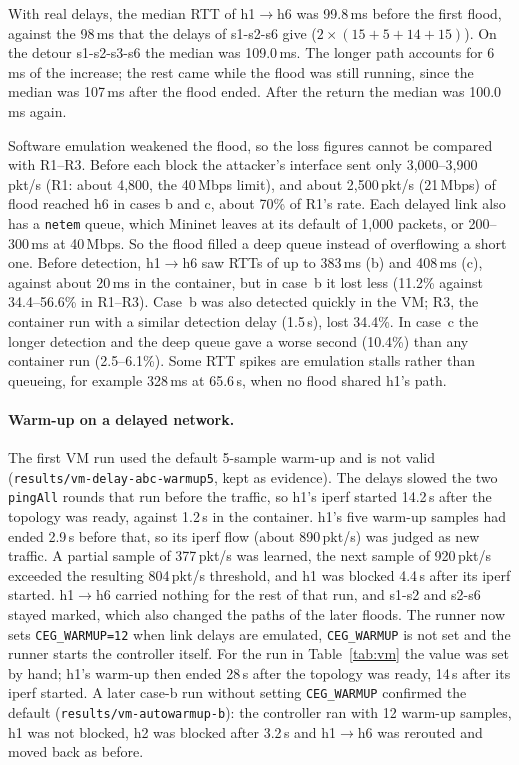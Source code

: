 \documentclass[11pt,a4paper]{article}
\newcommand{\ra}{\ensuremath{\rightarrow}}
\newcommand{\code}[1]{\texttt{#1}}
\newcommand{\tabref}[1]{Table~\ref{#1}}
\begin{document}
With real delays, the median RTT of h1\ra h6 was 99.8\,ms before the first flood, against the 98\,ms that the
delays of s1-s2-s6 give ($2\times(15+5+14+15)$). On the detour s1-s2-s3-s6 the median was 109.0\,ms. The longer
path accounts for 6\,ms of the increase; the rest came while the flood was still running, since the median was
107\,ms after the flood ended. After the return the median was 100.0\,ms again.

Software emulation weakened the flood, so the loss figures cannot be compared with R1--R3. Before each block the
attacker's interface sent only 3{,}000--3{,}900\,pkt/s (R1: about 4{,}800, the 40\,Mbps limit), and about
2{,}500\,pkt/s (21\,Mbps) of flood reached h6 in cases b and c, about 70\% of R1's rate. Each delayed link also
has a \code{netem} queue, which Mininet leaves at its default of 1{,}000 packets, or 200--300\,ms at 40\,Mbps.
So the flood filled a deep queue instead of overflowing a short one. Before detection, h1\ra h6 saw RTTs of up to
383\,ms (b) and 408\,ms (c), against about 20\,ms in the container, but in case~b it lost less (11.2\% against
34.4--56.6\% in R1--R3). Case~b was also detected quickly in the VM; R3, the container run with a similar
detection delay (1.5\,s), lost 34.4\%. In case~c the longer detection and the deep queue gave a worse second
(10.4\%) than any container run (2.5--6.1\%). Some RTT spikes are emulation stalls rather than queueing, for
example 328\,ms at 65.6\,s, when no flood shared h1's path.

\paragraph{Warm-up on a delayed network.} The first VM run used the default 5-sample warm-up and is not valid
(\code{results/vm-delay-abc-warmup5}, kept as evidence). The delays slowed the two \code{pingAll} rounds that
run before the traffic, so h1's iperf started 14.2\,s after the topology was ready, against 1.2\,s in the
container. h1's five warm-up samples had ended 2.9\,s before that, so its iperf flow (about 890\,pkt/s) was
judged as new traffic. A partial sample of 377\,pkt/s was learned, the next sample of 920\,pkt/s exceeded the
resulting 804\,pkt/s threshold, and h1 was blocked 4.4\,s after its iperf started. h1\ra h6 carried nothing for
the rest of that run, and s1-s2 and s2-s6 stayed marked, which also changed the paths of the later floods. The
runner now sets \code{CEG\_WARMUP=12} when link delays are emulated, \code{CEG\_WARMUP} is not set and the runner
starts the controller itself. For the run in \tabref{tab:vm} the value was set by hand; h1's warm-up then ended
28\,s after the topology was ready, 14\,s after its iperf started. A later case-b run without setting \code{CEG\_WARMUP} confirmed the default
(\code{results/vm-autowarmup-b}): the controller ran with 12 warm-up samples, h1 was not blocked, h2 was blocked
after 3.2\,s and h1\ra h6 was rerouted and moved back as before.
\end{document}

